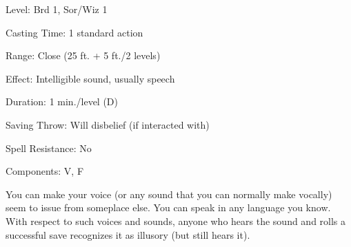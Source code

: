 
\begin{description*}
\item[Level:] Brd 1, Sor/Wiz 1
\item[Casting Time:] 1 standard action
\item[Range:] Close (25 ft. + 5 ft./2 levels)
\item[Effect:] Intelligible sound, usually speech
\item[Duration:] 1 min./level (D)
\item[Saving Throw:] Will disbelief (if interacted with)
\item[Spell Resistance:] No
\item[Components:] V, F
\end{description*}

You can make your voice (or any sound that you can normally make vocally) seem
to issue from someplace else. You can speak in any language you know. With respect
to such voices and sounds, anyone who hears the sound and rolls a successful save
recognizes it as illusory (but still hears it).